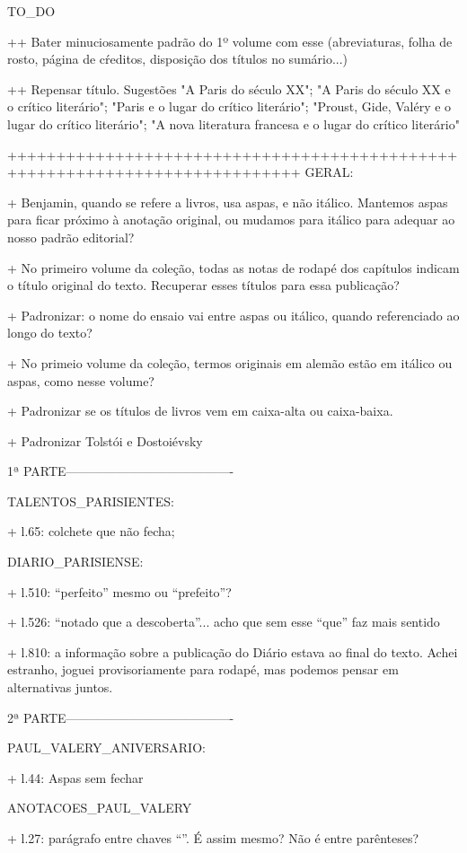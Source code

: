 TO_DO

++ Bater minuciosamente padrão do 1º volume com esse (abreviaturas, folha de rosto, página de cŕeditos, disposição dos títulos no sumário...)

++ Repensar título. Sugestões "A Paris do século XX"; "A Paris do século XX e o crítico literário"; "Paris e o lugar do crítico literário"; "Proust, Gide, Valéry e o lugar do crítico literário"; "A nova literatura francesa e o lugar do crítico literário"

++++++++++++++++++++++++++++++++++++++++++++++++++++++++++++++++++++++++++++
GERAL:

+ Benjamin, quando se refere a livros, usa aspas, e não itálico. Mantemos aspas para ficar próximo à anotação original, ou mudamos para itálico para adequar ao nosso padrão editorial?

+ No primeiro volume da coleção, todas as notas de rodapé dos capítulos indicam o título original do texto. Recuperar esses títulos para essa publicação?

+ Padronizar: o nome do ensaio vai entre aspas ou itálico, quando referenciado ao longo do texto?

+ No primeio volume da coleção, termos originais em alemão estão em itálico ou aspas, como nesse volume?

+ Padronizar se os títulos de livros vem em caixa-alta ou caixa-baixa.

+ Padronizar Tolstói e Dostoiévsky

1ª PARTE----------------------------------------


TALENTOS_PARISIENTES:

+ l.65: colchete que não fecha;

DIARIO_PARISIENSE:

+ l.510: ``perfeito'' mesmo ou ``prefeito''?

+ l.526: ``notado que a descoberta''... acho que sem esse ``que'' faz mais sentido

+ l.810: a informação sobre a publicação do Diário estava ao final do texto. Achei estranho, joguei provisoriamente para rodapé, mas podemos pensar em alternativas juntos.


2ª PARTE----------------------------------------

PAUL_VALERY_ANIVERSARIO:

+ l.44: Aspas sem fechar


ANOTACOES_PAUL_VALERY

+ l.27: parágrafo entre chaves ``{}''. É assim mesmo? Não é entre parênteses?

